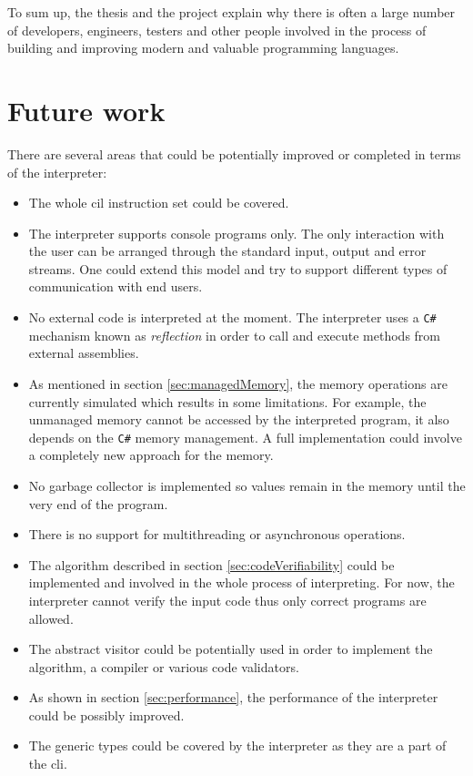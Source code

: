 \documentclass[declaration,shortabstract,english,mgr]{iithesis}
\begin{document}
To sum up, the thesis and the project explain why there is often a large number of developers, engineers, testers and other people involved in the process of building and improving modern and valuable programming languages.

\section{Future work}
\label{sec:future_work}

There are several areas that could be potentially improved or completed in terms of the interpreter:
\begin{itemize}
	\item{The whole \acrshort{cil} instruction set could be covered.}
	\item{The interpreter supports console programs only. The only interaction with the user can be arranged through the standard input, output and error streams. One could extend this model and try to support different types of communication with end users.}
	\item{No external code is interpreted at the moment. The interpreter uses a \texttt{C\#} mechanism known as \textit{reflection} in order to call and execute methods from external assemblies.}
	\item{As mentioned in section \ref{sec:managedMemory}, the memory operations are currently simulated which results in some limitations. For example, the unmanaged memory cannot be accessed by the interpreted program, it also depends on the \texttt{C\#} memory management. A full implementation could involve a completely new approach for the memory.}
	\item{No garbage collector is implemented so values remain in the memory until the very end of the program.}
	\item{There is no support for multithreading or asynchronous operations.}
	\item{The algorithm described in section \ref{sec:codeVerifiability} could be implemented and involved in the whole process of interpreting. For now, the interpreter cannot verify the input code thus only correct programs are allowed.}
	\item{The abstract visitor could be potentially used in order to implement the algorithm, a compiler or various code validators.}
	\item{As shown in section \ref{sec:performance}, the performance of the interpreter could be possibly improved.}
	\item{The generic types could be covered by the interpreter as they are a part of the \acrshort{cli}.}
\end{itemize}
\end{document}
